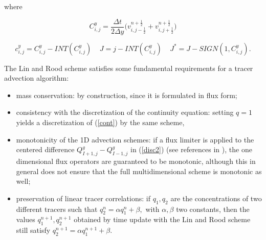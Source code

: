where

$$
C^y_{i,j}=\frac{\Delta t}{2\Delta y}\Big ( v^{n+\frac 12}_{i,j-\frac 12}+v^{n+\frac 12}_{i,j+\frac 12}
\Big )
$$

$$
c^y_{i,j}= C^y_{i,j} - INT(C^y_{i,j}) \ \ \ \ \  J=j-INT(C^y_{i,j}) \ \ \ \ \ 
J^*=J-SIGN(1,C^y_{i,j}).
$$

The Lin and Rood scheme satisfies some fundamental requirements
for a tracer advection algorithm:

\begin{itemize}

\item mass conservation: by construction, since it is formulated in
flux form;

\item consistency with the discretization of the continuity equation:
setting $q=1$ yields a discretization  of (\ref{cont}) by the same scheme,

\item monotonicity of the 1D advection schemes: if a flux limiter is
applied to the centered difference $ Q^g_{I+1,j}-Q^g_{I-1,j} $ in
(\ref{disc2}) (see references in \cite{lin96}), the one dimensional flux
operators are guaranteed to be monotonic, although this in general
does not ensure that the full multidimensional scheme is monotonic as
well;

\item preservation of linear tracer correlations: if $q_1, q_2$ are
the concentrations of two different tracers such that $q^n_2=\alpha
q^n_1 + \beta, $ with $\alpha, \beta $ two constants, then the values
$q^{n+1}_1, q^{n+1}_2$ obtained by time update with the Lin and Rood
scheme still satisfy $q^{n+1}_2=\alpha q^{n+1}_1 + \beta. $

\end{itemize}
